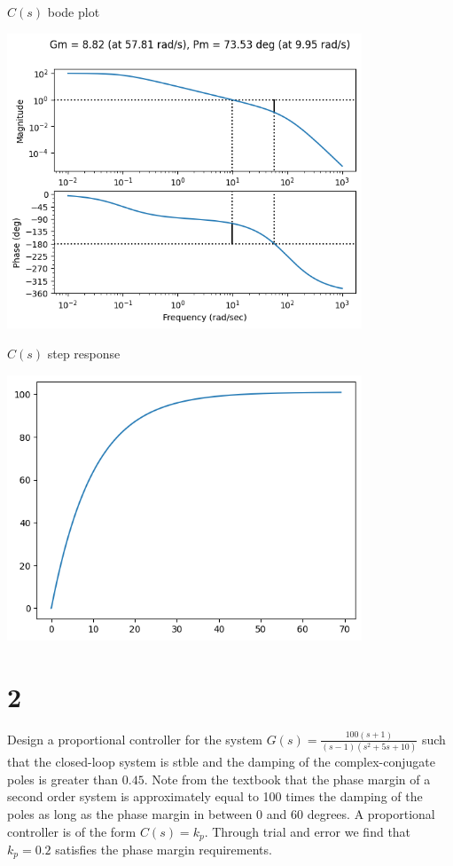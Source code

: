 \documentclass[11pt]{article}
\begin{document}
$C(s)$ bode plot

\includegraphics[width=300pt]{a5_3.png}

$C(s)$ step response

\includegraphics[width=300pt]{a5_4.png}

\section{2}

Design a proportional controller for the system $G(s) = \frac{100(s + 1)}{(s - 1)(s^2 + 5s + 10)}$ such that the closed-loop system is stble and the damping of the complex-conjugate poles is greater than $0.45$. Note from the textbook that the phase margin of a second order system is approximately equal to 100 times the damping of the poles as long as the phase margin in between 0 and 60 degrees. A proportional controller is of the form $C(s) = k_p$. Through trial and error we find that $k_p = 0.2$ satisfies the phase margin requirements.
\end{document}
